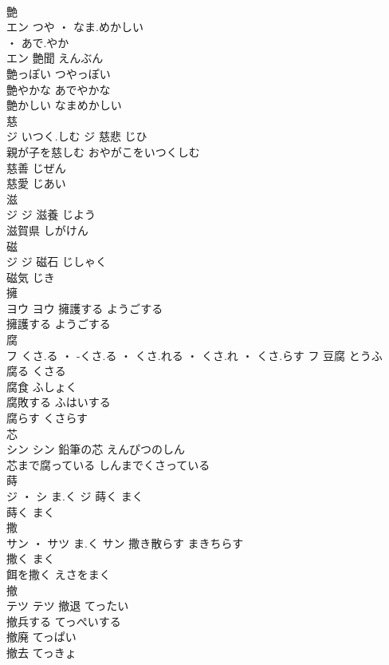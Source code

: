 \documentclass[8pt]{extreport}
\begin{document}
\begin{CJK}{UTF8}{min}
\\	艶	
\\	エン	つや ・ なま.めかしい
\\	・ あで.やか
\\	エン	艶聞	えんぶん	
\\	艶っぽい	つやっぽい	
\\	艶やかな	あでやかな	
\\	艶かしい	なまめかしい	
\\	慈	
\\	ジ	いつく.しむ	ジ	慈悲	じひ	
\\	親が子を慈しむ	おやがこをいつくしむ	
\\	慈善	じぜん	
\\	慈愛	じあい	
\\	滋	
\\	ジ		ジ	滋養	じよう	
\\	滋賀県	しがけん	
\\	磁	
\\	ジ		ジ	磁石	じしゃく	
\\	磁気	じき	
\\	擁	
\\	ヨウ		ヨウ	擁護する	ようごする	
\\	擁護する	ようごする	
\\	腐	
\\	フ	くさ.る ・ -くさ.る ・ くさ.れる ・ くさ.れ ・ くさ.らす	フ	豆腐	とうふ	
\\	腐る	くさる	
\\	腐食	ふしょく	
\\	腐敗する	ふはいする	
\\	腐らす	くさらす	
\\	芯	
\\	シン		シン	鉛筆の芯	えんぴつのしん	
\\	芯まで腐っている	しんまでくさっている	
\\	蒔	
\\	ジ ・ シ	ま.く	ジ	蒔く	まく	
\\	蒔く	まく	
\\	撒	
\\	サン ・ サツ	ま.く	サン	撒き散らす	まきちらす	
\\	撒く	まく	
\\	餌を撒く	えさをまく	
\\	撤	
\\	テツ		テツ	撤退	てったい	
\\	撤兵する	てっぺいする	
\\	撤廃	てっぱい	
\\	撤去	てっきょ	

\end{CJK}
\end{document}
